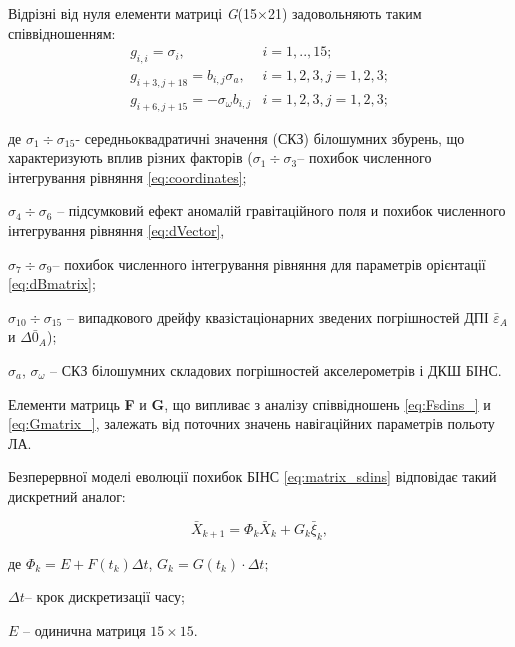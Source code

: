 Відрізні від нуля елементи матриці \textit{G}(15$\times $21) задовольняють таким 
співвідношенням:
\begin{equation} 
\label{eq:Gmatrix_} 
\begin{array}{cc} 
g_{i,i} =\sigma_{i},& i=1,..,15; \\ 
g_{i+3,j+18}=b_{i,j} \sigma_{a},& i=1,2,3,j=1,2,3;\\ 
g_{i+6,j+15}=-\sigma_{\omega } b_{i,j} & i=1,2,3,j=1,2,3; 
\end{array} 
\end{equation} 
\begin{ESKDexplanation}
\item де $\sigma_{1} \div \sigma_{15} $- середньоквадратичні значення (СКЗ) білошумних збурень, 
що характеризують вплив різних факторів ($\sigma_{1} \div \sigma_{3} $-- похибок 
численного інтегрування рівняння \eqref{eq:coordinates}; 
\item  $\sigma_{4} \div \sigma_{6} $ --  підсумковий ефект аномалій гравітаційного поля и похибок численного інтегрування 
рівняння \eqref{eq:dVector}, 
\item $\sigma_{7} \div \sigma_{9} $-- похибок численного інтегрування рівняння для параметрів орієнтації \eqref{eq:dBmatrix};  
\item $\sigma_{10} \div \sigma_{15} $ -- випадкового дрейфу квазістаціонарних зведених погрішностей 
ДПІ  $\bar{\varepsilon }_{A} $ и $\Delta \bar{0}_{A} $);
\item $\sigma_{a} $, $\sigma_{\omega } $ -- СКЗ білошумних складових погрішностей акселерометрів і ДКШ БІНС.
\end{ESKDexplanation}

Елементи матриць \textbf{F} и \textbf{G}, що випливає з аналізу співвідношень \eqref{eq:Fsdins_} 
и \eqref{eq:Gmatrix_}, залежать від поточних значень навігаційних параметрів польоту 
ЛА.

Безперервної моделі еволюції похибок БІНС  \eqref{eq:matrix_sdins} відповідає такий 
дискретний аналог:

\[\bar{X}_{k+1} =\Phi_{k} \bar{X}_{k} +G_{k} \bar{\xi}_{k} ,\] 
\begin{ESKDexplanation}
\item де $\Phi_{k}=E+F(t_{k})\Delta t$, $G_{k} =G(t_{k})\cdot \Delta t;$ 
\item $\Delta t$--  крок дискретизації часу;
\item $E$ -- одинична матриця  $15\times 15$.
\end{ESKDexplanation}

